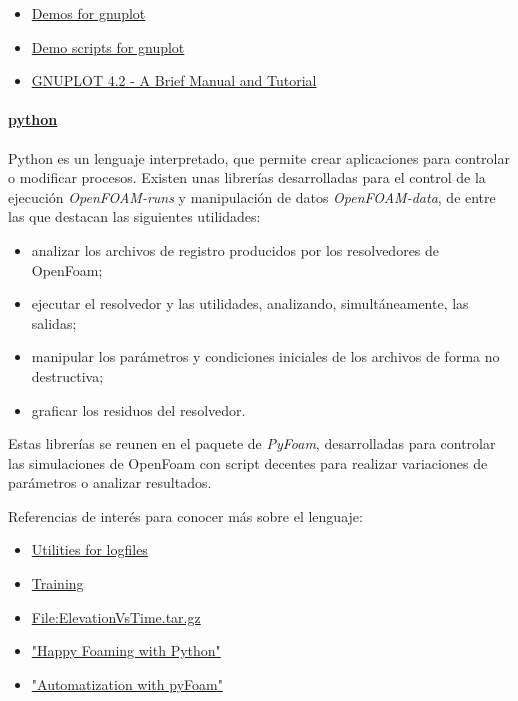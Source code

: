 \begin{itemize}
\item
  \href{http://gnuplot.sourceforge.net/demo/}{Demos for gnuplot}
\item
  \href{http://gnuplot.sourceforge.net/demo_4.2/}{Demo scripts for
  gnuplot}
\item
  \href{http://people.duke.edu/~hpgavin/gnuplot.html}{GNUPLOT 4.2 - A
  Brief Manual and Tutorial}
\end{itemize}

\paragraph{\texorpdfstring{
\href{https://openfoamwiki.net/index.php/Contrib/PyFoam}{python}}{python}}\label{header-n326}

Python es un lenguaje interpretado, que permite crear aplicaciones para
controlar o modificar procesos. Existen unas librerías desarrolladas
para el control de la ejecución \emph{OpenFOAM-runs} y manipulación de
datos \emph{OpenFOAM-data}, de entre las que destacan las siguientes
utilidades:

\begin{itemize}
\item
  analizar los archivos de registro producidos por los resolvedores de
  OpenFoam;
\item
  ejecutar el resolvedor y las utilidades, analizando, simultáneamente,
  las salidas;
\item
  manipular los parámetros y condiciones iniciales de los archivos de
  forma no destructiva;
\item
  graficar los residuos del resolvedor.
\end{itemize}

Estas librerías se reunen en el paquete de \emph{PyFoam}, desarrolladas
para controlar las simulaciones de OpenFoam con script decentes para
realizar variaciones de parámetros o analizar resultados.

Referencias de interés para conocer más sobre el lenguaje:

\begin{itemize}
\item
  \href{https://openfoamwiki.net/index.php/Contrib/PyFoam\#Utilities_for_Logfiles}{Utilities
  for logfiles}
\item
  \href{http://www.learnpython.org/es/}{Training}
\item
  \href{https://openfoamwiki.net/index.php/File:ElevationVsTime.tar.gz}{File:ElevationVsTime.tar.gz}
\item
  \href{https://openfoamwiki.net/images/d/de/HappyFoamingWithPyFoam.pdf}{"Happy
  Foaming with Python"}
\item
  \href{http://web.student.chalmers.se/groups/ofw5/Advanced_Training/pyFoamAdvanced.pdf}{"Automatization
  with pyFoam"}
\end{itemize}

